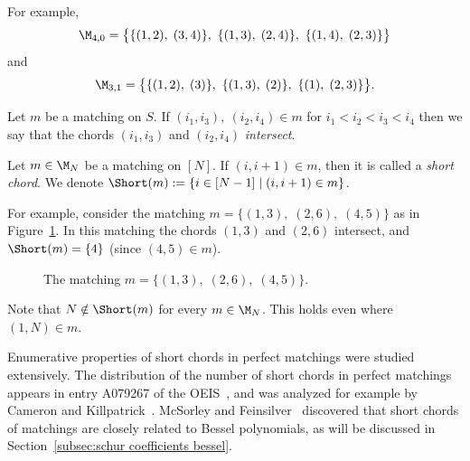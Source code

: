 For example, 
\[
    \M_{4,0} = \big\{\{(1,2),\; (3,4)\},\ \{(1,3),\; (2,4)\},\ \{(1,4),\; (2,3)\}\big\}
\]
and
\[ 
    \M_{3,1} = \big\{\{(1,2),\; (3)\},\ \{(1,3),\; (2)\},\ \{(1),\; (2,3)\}\big\}.
\]

\begin{definition}
\label{def:intersect}
    Let $m$ be a matching on $S$. If $(i_1, i_3),\: (i_2,i_4) \in m$ for $i_1 < i_2 < i_3 < i_4$ then we say that the chords $(i_1, i_3)$ and $(i_2, i_4)$ \emph{intersect}.
\end{definition}

\begin{definition}
\label{def:short}
    Let $m \in \M_N$ be a matching on $[N]$. If $(i,i+1) \in m$, then it is called a \emph{short chord}. We denote $\Short(m) := \{i \in [N-1] \mid (i,i+1) \in m\}$.

\end{definition}

For example, consider the matching $m = \{(1,3),\; (2,6),\; (4,5)\}$ as in Figure~\ref{fig:matching example introduction}. In this matching the chords $(1,3)$ and $(2,6)$ intersect, and $\Short(m) = \{4\}$ (since $(4,5) \in m$).
\begin{figure}[htb]
    \begin{center}
    \end{center}
    \caption{The matching $m = \{(1,3),\; (2,6),\; (4,5)\}$.}
    \label{fig:matching example introduction}
\end{figure}

Note that $N \notin \Short(m)$ for every $m \in \M_N$. This holds even where $(1,N) \in m$.



Enumerative properties of short chords in perfect matchings were studied extensively. The distribution of the number of short chords in perfect matchings appears in entry A079267 of the OEIS~\cite{oeis}, and was analyzed for example by Cameron and Killpatrick~\cite{killpatrick2020statistics}. McSorley and Feinsilver~\cite{bessel_polynomials_mathcings} discovered that short chords of matchings are closely related to Bessel polynomials, as will be discussed in Section~\ref{subsec:schur coefficients bessel}.

